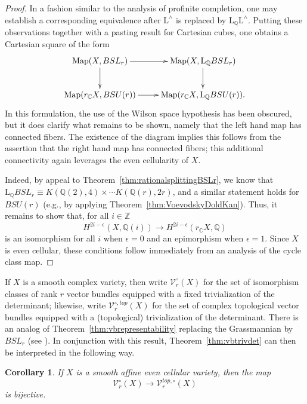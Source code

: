 \documentclass[11pt,leqno]{article}
\newcommand{\Map}{\operatorname{Map}}
\newcommand{\cplx}{{\mathbb C}}
\newcommand{\Q}{{\mathbb Q}}
\newcommand{\Z}{{\mathbb Z}}
\renewcommand{\1}{{\rm 1\hspace*{-0.4ex}%
\rule{0.1ex}{1.52ex}\hspace*{0.2ex}}}
\renewcommand{\L}{{\mathrm L}}
\newcommand{\<}[1]{{\langle}#1 {\rangle}}
\theoremstyle{plain}
\newtheorem{cor}[theorem]{Corollary}
\theoremstyle{definition}
\theoremstyle{remark}
\numberwithin{equation}{subsection}
\begin{document}
\begin{proof}
	In a fashion similar to the analysis of profinite completion, one may establish a corresponding equivalence after $\L^{\wedge}$ is replaced by $\L_{\Q}\L^{\wedge}$.  Putting these observations together with a pasting result for Cartesian cubes, one obtains a Cartesian square of the form
	\[
	\xymatrix{
	\Map(X,BSL_r) \ar[r]\ar[d] & \Map(X,\L_{\Q} BSL_r) \ar[d] \\
	\Map(r_{\cplx}X,BSU(r)) \ar[r] & \Map(r_{\cplx}X,\L_{\Q} BSU(r)).
	}
	\]
	In this formulation, the use of the Wilson space hypothesis has been obscured, but it does clarify what remains to be shown, namely that the left hand map has connected fibers.  The existence of the diagram implies this follows from the assertion that the right hand map has connected fibers; this additional connectivity again leverages the even cellularity of $X$.  
	
	Indeed, by appeal to Theorem~\ref{thm:rationalsplittingBSLr}, we know that $\L_{\Q}BSL_r \equiv K(\Q(2),4) \times \cdots K(\Q(r),2r)$, and a similar statement holds for $BSU(r)$ (e.g., by applying Theorem~\ref{thm:VoevodskyDoldKan}).  Thus, it remains to show that, for all $i \in \Z$ 
	\[
	H^{2i - \epsilon}(X,\Q(i)) \longrightarrow H^{2i-\epsilon}(r_{\cplx}X,\Q)
	\]
	is an isomorphism for all $i$ when $\epsilon = 0$ and an epimorphism when $\epsilon = 1$.  Since $X$ is even cellular, these conditions follow immediately from an analysis of the cycle class map. 
\end{proof}

If $X$ is a smooth complex variety, then write $\mathscr{V}_r^{\circ}(X)$ for the set of isomorphism classes of rank $r$ vector bundles equipped with a fixed trivialization of the determinant; likewise, write $\mathscr{V}_r^{\circ,top}(X)$ for the set of complex topological vector bundles equipped with a (topological) trivialization of the determinant.  There is an analog of Theorem~\ref{thm:vbrepresentability} replacing the Grassmannian by $BSL_r$ (see \cite[Theorem 4.1.1]{AHWII}).  In conjunction with this result, Theorem~\ref{thm:vbtrivdet} can then be interpreted in the following way.  

\begin{cor}
	\label{cor:orientedvbcellular}
	If $X$ is a smooth affine even cellular variety, then the map
	\[
	\mathscr{V}_r^{\circ}(X) \longrightarrow \mathscr{V}_r^{top,\circ}(X)
	\]
	is bijective.
\end{cor}
\end{document}
